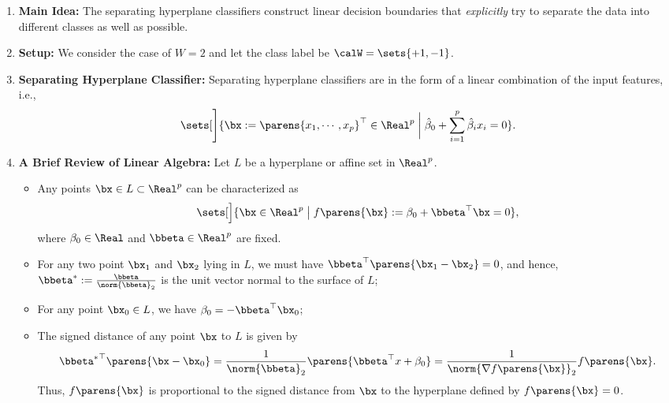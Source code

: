 \documentclass[12pt]{article}
\begin{document}
\begin{enumerate}[label=\textbf{\arabic*.}]

	\item \textbf{Main Idea:} The separating hyperplane classifiers construct linear decision boundaries that \emph{explicitly} try to separate the data into different classes as well as possible. 
	
	\item \textbf{Setup:} We consider the case of $W = 2$ and let the class label be $\calW = \sets{+1, -1}$. 
	
	\item \textbf{Separating Hyperplane Classifier:} Separating hyperplane classifiers are in the form of a linear combination of the input features, i.e., 
	\begin{align*}
		\sets[\Bigg]{\bx := \parens{x_1, \cdots, x_p}^\top \in \Real^p \biggm| \hat{\beta}_0 + \sum_{i=1}^p \hat{\beta}_i x_i = 0}. 
	\end{align*}
		
	\item \textbf{A Brief Review of Linear Algebra:} Let $L$ be a hyperplane or affine set in $\Real^p$. 
	\begin{itemize}
		\item Any points $\bx \in L \subset \Real^p$ can be characterized as 
		\begin{align*}
			\sets[\Big]{\bx \in \Real^p \bigm| f \parens{\bx} := \beta_0 + \bbeta^\top \bx = 0}, 
		\end{align*}
		where $\beta_0 \in \Real$ and $\bbeta \in \Real^p$ are fixed. 
		
		\item For any two point $\bx_1$ and $\bx_2$ lying in $L$, we must have $\bbeta^\top \parens{\bx_1 - \bx_2} = 0$, and hence, $\bbeta^* := \frac{\bbeta}{\norm{\bbeta}_2}$ is the unit vector normal to the surface of $L$; 
		
		\item For any point $\bx_0 \in L$, we have $\beta_0 = - \bbeta^\top \bx_0$; 
		
		\item The signed distance of any point $\bx$ to $L$ is given by 
		\begin{align*}
			{\bbeta^*}^\top \parens{\bx - \bx_0} = \frac{1}{\norm{\bbeta}_2} \parens{\bbeta^\top x + \beta_0} = \frac{1}{\norm{\nabla f \parens{\bx}}_2} f \parens{\bx}. 
		\end{align*}
		Thus, $f \parens{\bx}$ is proportional to the signed distance from $\bx$ to the hyperplane defined by $f \parens{\bx} = 0$. 
	\end{itemize}
	

\end{enumerate}
\end{document}
